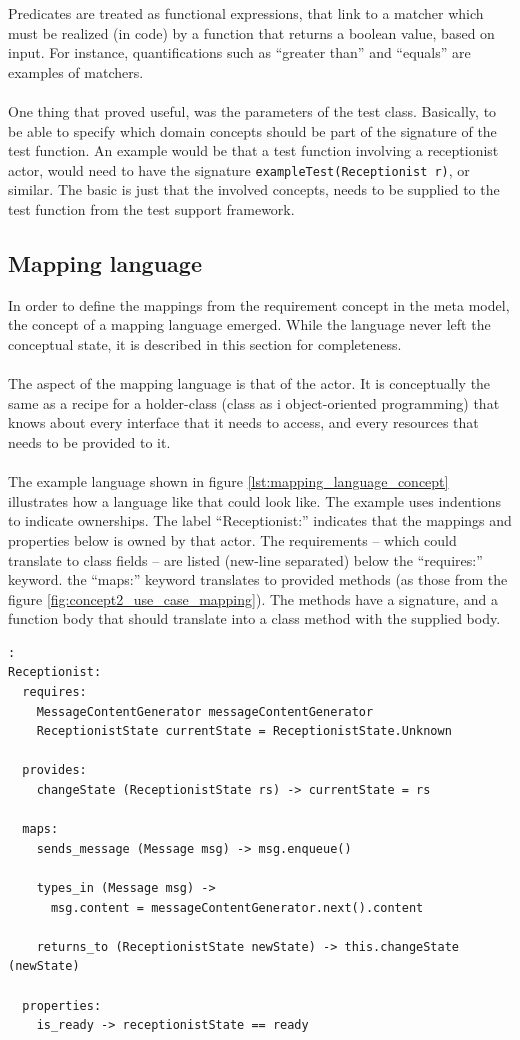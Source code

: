 Predicates are treated as functional expressions, that link to a matcher which must be realized (in code) by a function that returns a boolean value, based on input. For instance, quantifications such as ``greater than'' and ``equals'' are examples of matchers.\\\\
One thing that proved useful, was the parameters of the test class. Basically, to be able to specify which domain concepts should be part of the signature of the test function. An example would be that a test function involving a receptionist actor, would need to have the signature \texttt{exampleTest(Receptionist r)}, or similar. The basic is just that the involved concepts, needs to be supplied to the test function from the test support framework.
\subsection{Mapping language}
In order to define the mappings from the requirement concept in the meta model, the concept of a mapping language emerged. While the language never left the conceptual state, it is described in this section for completeness.\\\\
The aspect of the mapping language is that of the actor. It is conceptually the same as a recipe for a holder-class (class as i object-oriented programming) that knows about every interface that it needs to access, and every resources that needs to be provided to it.\\\\
The example language shown in figure \ref{lst:mapping_language_concept} illustrates how a language like that could look like. The example uses indentions to indicate ownerships. The label ``Receptionist:'' indicates that the mappings and properties below is owned by that actor. The requirements -- which could translate to class fields -- are listed (new-line separated) below the ``requires:'' keyword. the ``maps:'' keyword translates to provided methods (as those from the figure \ref{fig:concept2_use_case_mapping}). The methods have a signature, and a function body that should translate into a class method with the supplied body.
\newpage
\begin{lstlisting}[caption=example language for mapping concepts,label={lst:mapping_language_concept}]:
Receptionist:
  requires:
    MessageContentGenerator messageContentGenerator
    ReceptionistState currentState = ReceptionistState.Unknown
  
  provides:
    changeState (ReceptionistState rs) -> currentState = rs
  
  maps:
    sends_message (Message msg) -> msg.enqueue()

    types_in (Message msg) -> 
      msg.content = messageContentGenerator.next().content
    
    returns_to (ReceptionistState newState) -> this.changeState (newState)

  properties:
    is_ready -> receptionistState == ready
\end{lstlisting}

